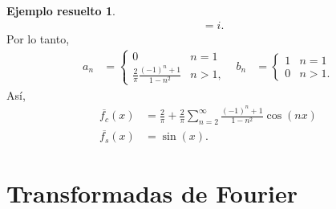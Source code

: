 \documentclass[11pt,letterpaper,draft]{report}
\theoremstyle{plain}
\theoremstyle{definition}
\newtheorem{solved}[theorem]{Ejemplo resuelto}
\theoremstyle{remark}
\newcommand\<{\langle}
\renewcommand\>{\rangle}
\begin{document}
\begin{solved}
\begin{align*}
    &=i.
  \end{align*}
  Por lo tanto,
  \begin{align*}
    a_n
    &=
    \begin{cases}
      0 & n=1 \\
      \frac{2}{\pi}\frac{(-1)^{n}+1}{1-n^{2}} & n>1,
    \end{cases}
    &
    b_n
    &=
    \begin{cases}
      1 & n=1 \\
      0 & n>1.
    \end{cases}
  \end{align*}
  Así,
  \begin{align*}
    \overline{f_c}(x)
    &=
    \frac{2}{\pi}
    +
    \frac{2}{\pi}
    \sum_{n=2}^{\infty}\frac{(-1)^{n}+1}{1-n^{2}}\cos(nx) \\
    \overline{f_s}(x)
    &= \sin(x).
  \end{align*}
\end{solved}

\section{Transformadas de Fourier}
\end{document}
